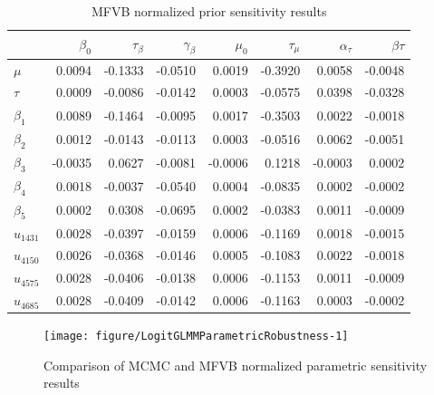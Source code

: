 \documentclass{article}\usepackage[]{graphicx}\usepackage[]{color}
\newenvironment{knitrout}{}{}
\theoremstyle{definition}
\theoremstyle{plain}
\theoremstyle{plain}
\theoremstyle{plain}
\theoremstyle{definition}
\theoremstyle{plain}
\theoremstyle{plain}
\begin{document}
\begin{table}
\begin{center}\begin{tabular}{lrrrrrrr}
  \hline
  & $\beta_{0}$ & $\tau_{\beta}$ & $\gamma_{\beta}$ & $\mu_0$ & $\tau_{\mu}$ & $\alpha_{\tau}$ & $\beta{\tau}$ \\ 
  \hline
$\mu$ & 0.0094 & -0.1333 & -0.0510 & 0.0019 & -0.3920 & 0.0058 & -0.0048 \\ 
  $\tau$ & 0.0009 & -0.0086 & -0.0142 & 0.0003 & -0.0575 & 0.0398 & -0.0328 \\ 
  $\beta_{1}$ & 0.0089 & -0.1464 & -0.0095 & 0.0017 & -0.3503 & 0.0022 & -0.0018 \\ 
  $\beta_{2}$ & 0.0012 & -0.0143 & -0.0113 & 0.0003 & -0.0516 & 0.0062 & -0.0051 \\ 
  $\beta_{3}$ & -0.0035 & 0.0627 & -0.0081 & -0.0006 & 0.1218 & -0.0003 & 0.0002 \\ 
  $\beta_{4}$ & 0.0018 & -0.0037 & -0.0540 & 0.0004 & -0.0835 & 0.0002 & -0.0002 \\ 
  $\beta_{5}$ & 0.0002 & 0.0308 & -0.0695 & 0.0002 & -0.0383 & 0.0011 & -0.0009 \\ 
  $u_{1431}$ & 0.0028 & -0.0397 & -0.0159 & 0.0006 & -0.1169 & 0.0018 & -0.0015 \\ 
  $u_{4150}$ & 0.0026 & -0.0368 & -0.0146 & 0.0005 & -0.1083 & 0.0022 & -0.0018 \\ 
  $u_{4575}$ & 0.0028 & -0.0406 & -0.0138 & 0.0006 & -0.1153 & 0.0011 & -0.0009 \\ 
  $u_{4685}$ & 0.0028 & -0.0409 & -0.0142 & 0.0006 & -0.1163 & 0.0003 & -0.0002 \\ 
   \hline
\end{tabular}
\end{center}
\caption{MFVB normalized prior sensitivity results\label{tab:prior_sens}}
\end{table}

\begin{knitrout}
\color{fgcolor}\begin{figure}[t]

{\centering \texttt{[image: figure/LogitGLMMParametricRobustness-1]} 

}

\caption[Comparison of MCMC and MFVB normalized parametric sensitivity results]{Comparison of MCMC and MFVB normalized parametric sensitivity results}\label{fig:LogitGLMMParametricRobustness}
\end{figure}


\end{knitrout}
\end{document}
